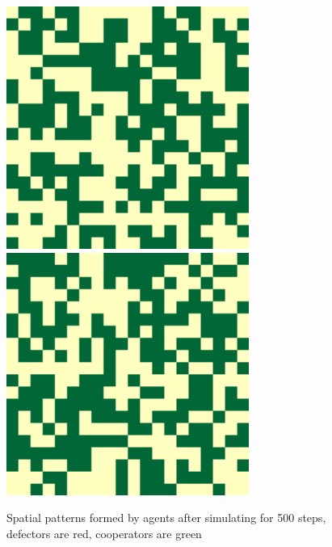 \documentclass[english]{article}
\begin{document}
\begin{figure}[!hb]
{    \includegraphics[width=\textwidth/4]{spatial-memory1+gossip1+range3-B.pdf}
    \includegraphics[width=\textwidth/4]{spatial-memory1+gossip1+range3-C.pdf}
  }
  \caption{Spatial patterns formed by agents after simulating for 500 steps, defectors are red, cooperators are green}
  \label{fig:spatial}
\end{figure}
\end{document}
